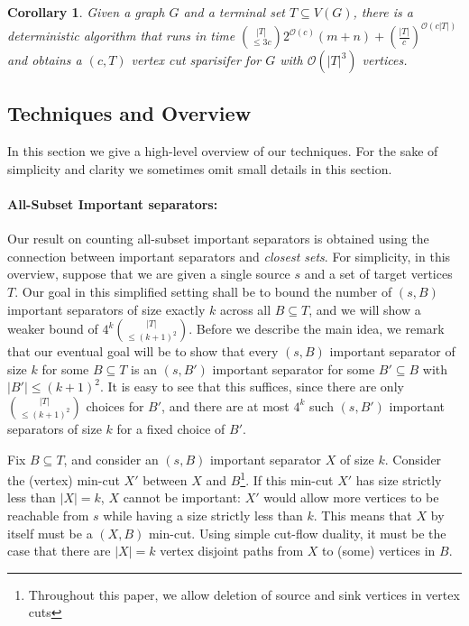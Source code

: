 \documentclass[11pt]{article}
\newtheorem{corollary}[theorem]{Corollary}
\newcommand{\OO}{\mathcal{O}}
\begin{document}
\begin{corollary}
Given  a graph $G$ and a terminal set $T \subseteq V(G)$, there is a deterministic algorithm that runs in time ${|T| \choose \leq 3c} 2^{\OO(c)}(m + n) + \left(\frac{|T|}{c}\right)^{\OO(c|T|)}$ and obtains a $(c,T)$ vertex cut sparisifer for $G$ with $\OO(|T|^3)$ vertices.
\end{corollary}










\subsection{Techniques and Overview}

In this section we give a high-level overview of our techniques. For the sake of simplicity and clarity we sometimes omit small details in this section.

\paragraph{All-Subset Important separators:} Our result on counting all-subset important separators is obtained using the connection between important separators and \emph{closest sets}. For simplicity, in this overview, suppose that we are given a single source $s$ and a set of target vertices $T$. Our goal in this simplified setting shall be to bound the number of $(s,B)$ important separators of size exactly $k$ across all $B \subseteq T$, and we will show a weaker bound of $4^k{|T| \choose \leq {(k +1)^2}}$. Before we describe the main idea, we remark that our eventual goal will be to show that every $(s,B)$ important separator of size $k$ for some $B \subseteq T$ is an $(s,B')$ important separator for some $B' \subseteq B$ with $|B'| \leq (k +1)^2$. It is easy to see that this suffices, since there are only ${|T| \choose \leq (k + 1)^2}$ choices for $B'$, and there are at most $4^k$ such $(s,B')$ important separators of size $k$ for a fixed choice of $B'$.  





Fix $B \subseteq T$, and consider an $(s,B)$ important separator $X$ of size $k$. Consider the (vertex) min-cut $X'$ between $X$ and $B$\footnote{Throughout this paper, we allow deletion of source and sink vertices in vertex cuts}. If this min-cut $X'$ has size strictly less than $|X| = k$, $X$ cannot be important: $X'$ would allow more vertices to be reachable from $s$ while having a size strictly less than $k$. This means that $X$ by itself must be a $(X,B)$ min-cut. Using simple cut-flow duality, it must be the case that there are $|X| = k$ vertex disjoint paths from $X$ to (some) vertices in $B$.
\end{document}
